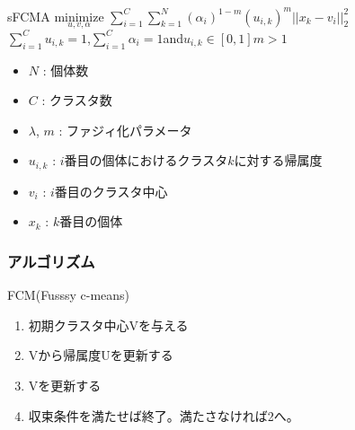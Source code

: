 \documentclass[13pt,dvipdfmx]{beamer}
\begin{document}
\begin{frame}
  \begin{block}{sFCMA}
    \quad$\underset{u,v,\alpha}{\text{minimize}}$
    $\sum_{i=1}^C\sum_{k=1}^N(\alpha_{i})^{1-m}(u_{i,k})^m||x_k-v_i||_2^2$\\
    $\sum_{i=1}^Cu_{i,k}=1$\;,\;$\sum_{i=1}^C\alpha_{i}=1$\;and\;$u_{i,k}\in[0,1]$\quad$m>1$
  \end{block}
  \begin{itemize}
    \item $N$ : 個体数
    \item $C$ : クラスタ数
    \item $\lambda$, $m$ : ファジィ化パラメータ
    \item $u_{i,k}$ : $i$番目の個体におけるクラスタ$k$に対する帰属度
    \item $v_{i}$ : $i$番目のクラスタ中心
    \item $x_{k}$ : $k$番目の個体
  \end{itemize}
\end{frame}

\begin{frame}\frametitle{アルゴリズム}
\begin{block}{FCM(Fusssy c-means)}
\begin{enumerate}
 \item 初期クラスタ中心Vを与える
 \item Vから帰属度Uを更新する
 \item Vを更新する
 \item 収束条件を満たせば終了。満たさなければ2へ。
\end{enumerate}
\end{block}
\end{frame}
\end{document}
